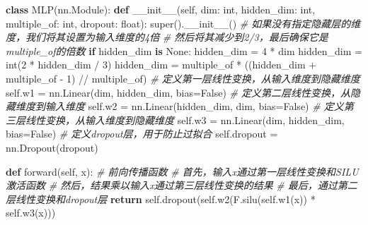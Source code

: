 \documentclass[
]{article}
\newenvironment{Shaded}{}{}
\newcommand{\BuiltInTok}[1]{\textcolor[rgb]{0.00,0.50,0.00}{#1}}
\newcommand{\CommentTok}[1]{\textcolor[rgb]{0.38,0.63,0.69}{\textit{#1}}}
\newcommand{\ControlFlowTok}[1]{\textcolor[rgb]{0.00,0.44,0.13}{\textbf{#1}}}
\newcommand{\DecValTok}[1]{\textcolor[rgb]{0.25,0.63,0.44}{#1}}
\newcommand{\FunctionTok}[1]{\textcolor[rgb]{0.02,0.16,0.49}{#1}}
\newcommand{\KeywordTok}[1]{\textcolor[rgb]{0.00,0.44,0.13}{\textbf{#1}}}
\newcommand{\NormalTok}[1]{#1}
\newcommand{\OperatorTok}[1]{\textcolor[rgb]{0.40,0.40,0.40}{#1}}
\newcommand{\VariableTok}[1]{\textcolor[rgb]{0.10,0.09,0.49}{#1}}
\begin{document}
\begin{Shaded}
\begin{Highlighting}[]
\KeywordTok{class}\NormalTok{ MLP(nn.Module):}
    \KeywordTok{def} \FunctionTok{\_\_init\_\_}\NormalTok{(}\VariableTok{self}\NormalTok{, dim: }\BuiltInTok{int}\NormalTok{, hidden\_dim: }\BuiltInTok{int}\NormalTok{, multiple\_of: }\BuiltInTok{int}\NormalTok{, dropout: }\BuiltInTok{float}\NormalTok{):}
        \BuiltInTok{super}\NormalTok{().}\FunctionTok{\_\_init\_\_}\NormalTok{()}
        \CommentTok{\# 如果没有指定隐藏层的维度，我们将其设置为输入维度的4倍}
        \CommentTok{\# 然后将其减少到2/3，最后确保它是multiple\_of的倍数}
        \ControlFlowTok{if}\NormalTok{ hidden\_dim }\KeywordTok{is} \VariableTok{None}\NormalTok{:}
\NormalTok{            hidden\_dim }\OperatorTok{=} \DecValTok{4} \OperatorTok{*}\NormalTok{ dim}
\NormalTok{            hidden\_dim }\OperatorTok{=} \BuiltInTok{int}\NormalTok{(}\DecValTok{2} \OperatorTok{*}\NormalTok{ hidden\_dim }\OperatorTok{/} \DecValTok{3}\NormalTok{)}
\NormalTok{            hidden\_dim }\OperatorTok{=}\NormalTok{ multiple\_of }\OperatorTok{*}\NormalTok{ ((hidden\_dim }\OperatorTok{+}\NormalTok{ multiple\_of }\OperatorTok{{-}} \DecValTok{1}\NormalTok{) }\OperatorTok{//}\NormalTok{ multiple\_of)}
        \CommentTok{\# 定义第一层线性变换，从输入维度到隐藏维度}
        \VariableTok{self}\NormalTok{.w1 }\OperatorTok{=}\NormalTok{ nn.Linear(dim, hidden\_dim, bias}\OperatorTok{=}\VariableTok{False}\NormalTok{)}
        \CommentTok{\# 定义第二层线性变换，从隐藏维度到输入维度}
        \VariableTok{self}\NormalTok{.w2 }\OperatorTok{=}\NormalTok{ nn.Linear(hidden\_dim, dim, bias}\OperatorTok{=}\VariableTok{False}\NormalTok{)}
        \CommentTok{\# 定义第三层线性变换，从输入维度到隐藏维度}
        \VariableTok{self}\NormalTok{.w3 }\OperatorTok{=}\NormalTok{ nn.Linear(dim, hidden\_dim, bias}\OperatorTok{=}\VariableTok{False}\NormalTok{)}
        \CommentTok{\# 定义dropout层，用于防止过拟合}
        \VariableTok{self}\NormalTok{.dropout }\OperatorTok{=}\NormalTok{ nn.Dropout(dropout)}

    \KeywordTok{def}\NormalTok{ forward(}\VariableTok{self}\NormalTok{, x):}
        \CommentTok{\# 前向传播函数}
        \CommentTok{\# 首先，输入x通过第一层线性变换和SILU激活函数}
        \CommentTok{\# 然后，结果乘以输入x通过第三层线性变换的结果}
        \CommentTok{\# 最后，通过第二层线性变换和dropout层}
        \ControlFlowTok{return} \VariableTok{self}\NormalTok{.dropout(}\VariableTok{self}\NormalTok{.w2(F.silu(}\VariableTok{self}\NormalTok{.w1(x)) }\OperatorTok{*} \VariableTok{self}\NormalTok{.w3(x)))}
\end{Highlighting}
\end{Shaded}
\end{document}

